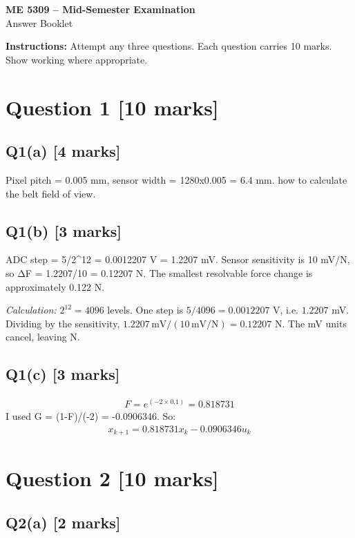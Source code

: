 \documentclass[11pt,a4paper]{article}
\begin{document}
\begin{center}
{\Large\bfseries ME 5309 -- Mid-Semester Examination}\\[3pt]
{\large Answer Booklet}\\[8pt]
\end{center}
\textbf{Instructions:} Attempt any three questions. Each question carries 10 marks. Show working where appropriate.
\section*{Question 1 \hfill [10 marks]}
\subsection*{Q1(a) \hfill [4 marks]}

Pixel pitch = 0.005 mm, sensor width = 1280x0.005 = 6.4 mm. how to calculate the belt field of view.

\subsection*{Q1(b) \hfill [3 marks]}

ADC step = 5/2\textasciicircum{}12 = 0.0012207 V = 1.2207 mV.
Sensor sensitivity is 10 mV/N, so ΔF = 1.2207/10 = 0.12207 N.
The smallest resolvable force change is approximately 0.122 N.\par\smallskip\textit{Calculation:} $2^{12}=4096$ levels. One step is $5/4096=0.0012207$ V, i.e. $1.2207$ mV. Dividing by the sensitivity, $1.2207\,\mathrm{mV}/(10\,\mathrm{mV/N})=0.12207$ N. The mV units cancel, leaving N.

\subsection*{Q1(c) \hfill [3 marks]}

\[\begin{aligned}F = e^(-2\times0.1) = 0.818731\end{aligned}\]
I used G = (1-F)/(-2) = -0.0906346.
So:\[\begin{aligned}x_{k+1} = 0.818731x_k - 0.0906346u_k\end{aligned}\]

\section*{Question 2 \hfill [10 marks]}
\subsection*{Q2(a) \hfill [2 marks]}
\end{document}
